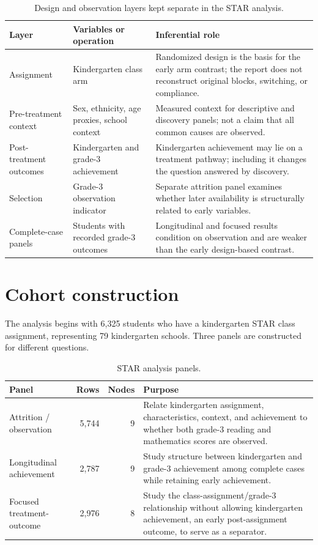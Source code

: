 \documentclass[11pt,a4paper,oneside]{report}
\begin{document}
\begin{table}[H]
\centering
\caption{Design and observation layers kept separate in the STAR analysis.}
\label{tab:star-evidence-flow}
\begin{tabularx}{\textwidth}{p{}p{}Y}
\toprule
Layer & Variables or operation & Inferential role \\
\midrule
Assignment & Kindergarten class arm & Randomized design is the basis for the
early arm contrast; the report does not reconstruct original blocks,
switching, or compliance. \\
Pre-treatment context & Sex, ethnicity, age proxies, school context &
Measured context for descriptive and discovery panels; not a claim that all
common causes are observed. \\
Post-treatment outcomes & Kindergarten and grade-3 achievement &
Kindergarten achievement may lie on a treatment pathway; including it changes
the question answered by discovery. \\
Selection & Grade-3 observation indicator & Separate attrition panel examines
whether later availability is structurally related to early variables. \\
Complete-case panels & Students with recorded grade-3 outcomes &
Longitudinal and focused results condition on observation and are weaker than
the early design-based contrast. \\
\bottomrule
\end{tabularx}
\end{table}

\section{Cohort construction}

The analysis begins with 6,325 students who have a kindergarten STAR class
assignment, representing 79 kindergarten schools. Three panels are constructed
for different questions.

\begin{table}[H]
\centering
\caption{STAR analysis panels.}
\label{tab:panels}
\begin{tabularx}{\textwidth}{p{}rrY}
\toprule
Panel & Rows & Nodes & Purpose \\
\midrule
Attrition / observation & 5,744 & 9 &
Relate kindergarten assignment, characteristics, context, and achievement to
whether both grade-3 reading and mathematics scores are observed. \\
Longitudinal achievement & 2,787 & 9 &
Study structure between kindergarten and grade-3 achievement among complete
cases while retaining early achievement. \\
Focused treatment-outcome & 2,976 & 8 &
Study the class-assignment/grade-3 relationship without allowing
kindergarten achievement, an early post-assignment outcome, to serve as a
separator. \\
\bottomrule
\end{tabularx}
\end{table}
\end{document}
